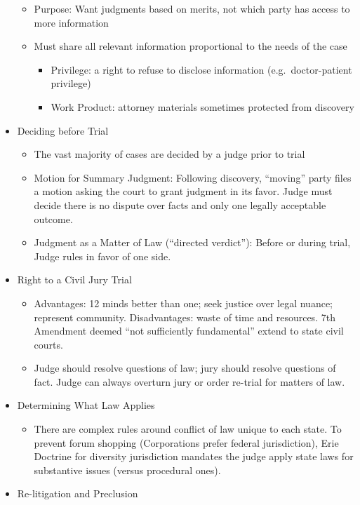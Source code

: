 \documentclass[
]{article}
\providecommand{\tightlist}{%
  \setlength{\itemsep}{0pt}\setlength{\parskip}{0pt}}
\begin{document}
\begin{itemize}
  \begin{itemize}
  \item
    Purpose: Want judgments based on merits, not which party has access
    to more information
  \item
    Must share all relevant information proportional to the needs of the
    case

    \begin{itemize}
    \item
      Privilege: a right to refuse to disclose information
      (e.g.~doctor-patient privilege)
    \item
      Work Product: attorney materials sometimes protected from
      discovery
    \end{itemize}
  \end{itemize}
\item
  Deciding before Trial

  \begin{itemize}
  \item
    The vast majority of cases are decided by a judge prior to trial
  \item
    Motion for Summary Judgment: Following discovery, ``moving'' party
    files a motion asking the court to grant judgment in its favor.
    Judge must decide there is no dispute over facts and only one
    legally acceptable outcome.
  \item
    Judgment as a Matter of Law (``directed verdict''): Before or during
    trial, Judge rules in favor of one side.
  \end{itemize}
\item
  Right to a Civil Jury Trial

  \begin{itemize}
  \item
    Advantages: 12 minds better than one; seek justice over legal
    nuance; represent community. Disadvantages: waste of time and
    resources. 7th Amendment deemed ``not sufficiently fundamental''
    extend to state civil courts.
  \item
    Judge should resolve questions of law; jury should resolve questions
    of fact. Judge can always overturn jury or order re-trial for
    matters of law.
  \end{itemize}
\item
  Determining What Law Applies

  \begin{itemize}
  \tightlist
  \item
    There are complex rules around conflict of law unique to each state.
    To prevent forum shopping (Corporations prefer federal
    jurisdiction), Erie Doctrine for diversity jurisdiction mandates the
    judge apply state laws for substantive issues (versus procedural
    ones).
  \end{itemize}
\item
  Re-litigation and Preclusion


\end{itemize}
\end{document}
